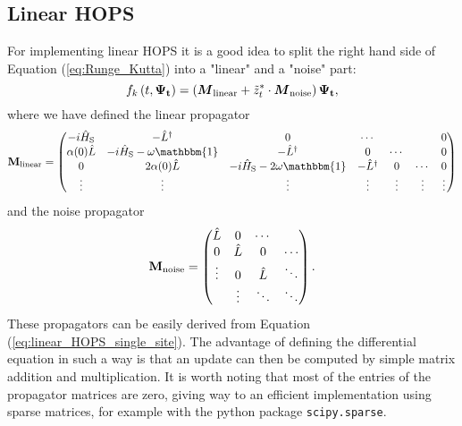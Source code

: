 \subsection*{Linear HOPS}
For implementing linear HOPS it is a good idea to split the right hand side of Equation (\ref{eq:Runge_Kutta}) into a "linear" and a "noise" part:
\begin{equation*}
    f_k\left(t, \vb{\Psi_t}\right) = \left(\vb*{M}_\text{linear} + \tilde{z}_t^* \cdot \vb*{M}_\text{noise} \right) \vb{\Psi_t},
\end{equation*}
where we have defined the linear propagator
\begin{equation*}
    \vb{M}_\text{linear} =
    \begin{pmatrix}
        -i\hat{H}_\text{S} & -\hat{L}^\dagger                    & 0                                     & \cdots           &        &        & 0 \\
        \alpha(0)\hat{L}   & -i\hat{H}_\text{S}-\omega\mathbbm{1} & -\hat{L}^{\dagger}                    & 0                & \cdots &        & 0 \\
        0                  & 2\alpha(0)\hat{L}                   & -i\hat{H}_\text{S}-2\omega\mathbbm{1}  & -\hat{L}^\dagger & 0      & \cdots & 0 \\
        \vdots             & \vdots                              & \vdots                                & \vdots           & \vdots & \vdots & \vdots \\
    \end{pmatrix}
\end{equation*}
and the noise propagator
\begin{equation*}
    \vb{M}_\text{noise} =
    \begin{pmatrix}
        \hat{L} & 0       & \cdots  &        \\
        0       & \hat{L} & 0       & \cdots \\
        \vdots  & 0       & \hat{L} & \ddots \\
                & \vdots  & \ddots  & \ddots \\
    \end{pmatrix}.
\end{equation*}
These propagators can be easily derived from Equation (\ref{eq:linear_HOPS_single_site}).
The advantage of defining the differential equation in such a way is that an update can then be computed by simple matrix
addition and multiplication. It is worth noting that most of the entries of the propagator matrices are zero, giving way
to an efficient implementation using sparse matrices, for example with the python package \verb|scipy.sparse|.

